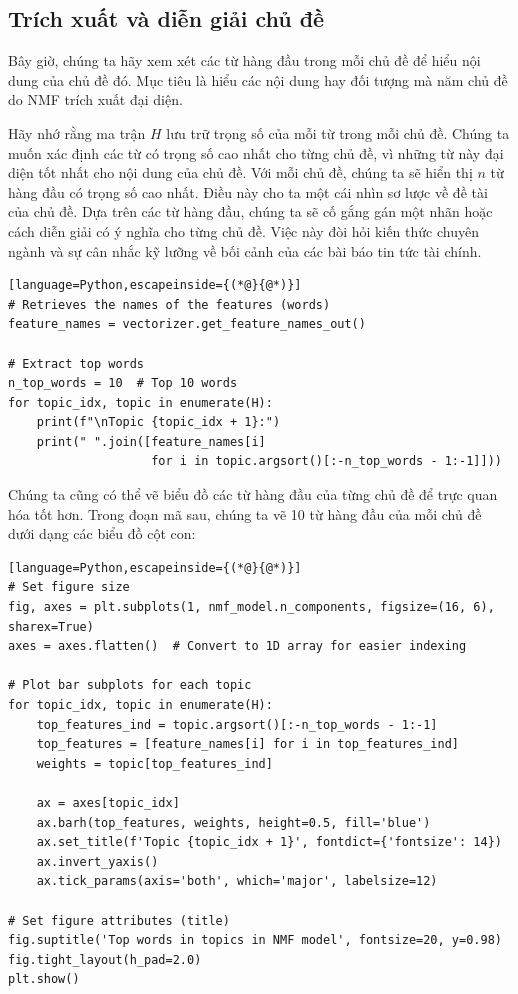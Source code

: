 \subsection{Trích xuất và diễn giải chủ đề}

Bây giờ, chúng ta hãy xem xét các từ hàng đầu trong mỗi chủ đề để hiểu nội dung của chủ đề đó. Mục tiêu là hiểu các nội dung hay đối tượng mà năm chủ đề do NMF trích xuất đại diện.

Hãy nhớ rằng ma trận \(H\) lưu trữ trọng số của mỗi từ trong mỗi chủ đề. Chúng ta muốn xác định các từ có trọng số cao nhất cho từng chủ đề, vì những từ này đại diện tốt nhất cho nội dung của chủ đề. Với mỗi chủ đề, chúng ta sẽ hiển thị \(n\) từ hàng đầu có trọng số cao nhất. Điều này cho ta một cái nhìn sơ lược về đề tài của chủ đề. Dựa trên các từ hàng đầu, chúng ta sẽ cố gắng gán một nhãn hoặc cách diễn giải có ý nghĩa cho từng chủ đề. Việc này đòi hỏi kiến thức chuyên ngành và sự cân nhắc kỹ lưỡng về bối cảnh của các bài báo tin tức tài chính.

\begin{lstlisting}[language=Python,escapeinside={(*@}{@*)}]
# Retrieves the names of the features (words)
feature_names = vectorizer.get_feature_names_out()

# Extract top words
n_top_words = 10  # Top 10 words
for topic_idx, topic in enumerate(H):
    print(f"\nTopic {topic_idx + 1}:")
    print(" ".join([feature_names[i]
                    for i in topic.argsort()[:-n_top_words - 1:-1]]))
\end{lstlisting}

Chúng ta cũng có thể vẽ biểu đồ các từ hàng đầu của từng chủ đề để trực quan hóa tốt hơn. Trong đoạn mã sau, chúng ta vẽ 10 từ hàng đầu của mỗi chủ đề dưới dạng các biểu đồ cột con:

\begin{lstlisting}[language=Python,escapeinside={(*@}{@*)}]
# Set figure size
fig, axes = plt.subplots(1, nmf_model.n_components, figsize=(16, 6), sharex=True)
axes = axes.flatten()  # Convert to 1D array for easier indexing

# Plot bar subplots for each topic
for topic_idx, topic in enumerate(H):
    top_features_ind = topic.argsort()[:-n_top_words - 1:-1]
    top_features = [feature_names[i] for i in top_features_ind]
    weights = topic[top_features_ind]

    ax = axes[topic_idx]
    ax.barh(top_features, weights, height=0.5, fill='blue')
    ax.set_title(f'Topic {topic_idx + 1}', fontdict={'fontsize': 14})
    ax.invert_yaxis()
    ax.tick_params(axis='both', which='major', labelsize=12)

# Set figure attributes (title)
fig.suptitle('Top words in topics in NMF model', fontsize=20, y=0.98)
fig.tight_layout(h_pad=2.0)
plt.show()
\end{lstlisting}

